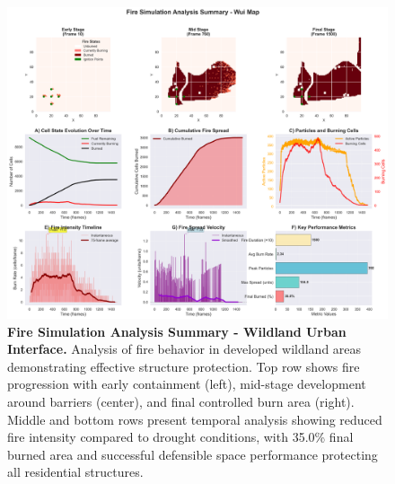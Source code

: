 \begin{figure}[H]
	\centering
	\includegraphics[width=\textwidth]{media/report_summary_wui.png}
	\caption{
		\textbf{Fire Simulation Analysis Summary - Wildland Urban Interface.} 
		Analysis of fire behavior in developed wildland areas demonstrating effective structure protection. Top row shows fire progression with early containment (left), mid-stage development around barriers (center), and final controlled burn area (right). Middle and bottom rows present temporal analysis showing reduced fire intensity compared to drought conditions, with 35.0\% final burned area and successful defensible space performance protecting all residential structures.
	}
	\label{fig:res_wui}
\end{figure}

